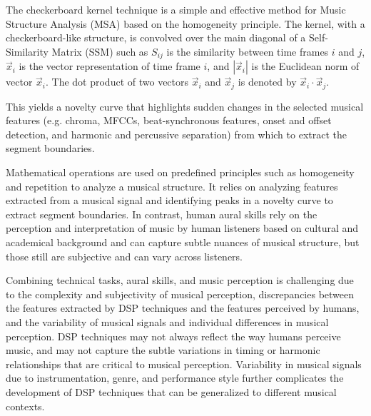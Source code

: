 The checkerboard kernel technique is a simple and effective method for Music Structure Analysis (MSA) based on the homogeneity principle. The kernel, with a checkerboard-like structure, is convolved over the main diagonal of a Self-Similarity Matrix (SSM) such as $S_{ij}$ is the similarity between time frames $i$ and $j$, $\vec{x}_i$ is the vector representation of time frame $i$, and $\left| \vec{x}_i \right|$ is the Euclidean norm of vector $\vec{x}_i$. The dot product of two vectors $\vec{x}_i$ and $\vec{x}_j$ is denoted by $\vec{x}_i \cdot \vec{x}_j$.



This yields a novelty curve that highlights sudden changes in the selected musical features (e.g. chroma, MFCCs, beat-synchronous features, onset and offset detection, and harmonic and percussive separation) from which to extract the segment boundaries.



Mathematical operations are used on predefined principles such as homogeneity and repetition to analyze a musical structure. It relies on analyzing features extracted from a musical signal and identifying peaks in a novelty curve to extract segment boundaries. In contrast, human aural skills rely on the perception and interpretation of music by human listeners based on cultural and academical background and can capture subtle nuances of musical structure, but those still are subjective and can vary across listeners.

Combining technical tasks, aural skills, and music perception is challenging due to the complexity and subjectivity of musical perception, discrepancies between the features extracted by DSP techniques and the features perceived by humans, and the variability of musical signals and individual differences in musical perception. DSP techniques may not always reflect the way humans perceive music, and may not capture the subtle variations in timing or harmonic relationships that are critical to musical perception. Variability in musical signals due to instrumentation, genre, and performance style further complicates the development of DSP techniques that can be generalized to different musical contexts.

